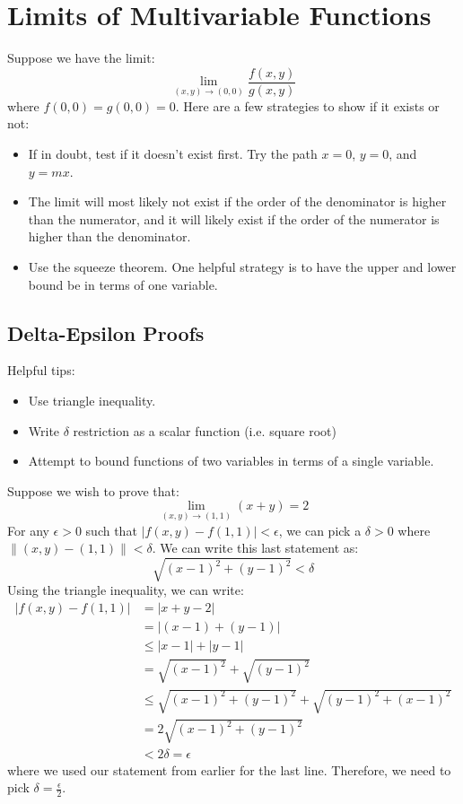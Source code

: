 \documentclass{article}
\begin{document}
        \section{Limits of Multivariable Functions}
        Suppose we have the limit:
    \begin{equation}
        \lim_{(x,y) \to (0,0)} \frac{f(x,y)}{g(x,y)}
    \end{equation}
    where $f(0,0)=g(0,0)=0$. Here are a few strategies to show if it exists or not:
    \begin{itemize}
        \item If in doubt, test if it doesn't exist first. Try the path $x=0$, $y=0$, and $y=mx$.
        \item The limit will most likely not exist if the order of the denominator is higher than the numerator, and it will likely exist if the order of the numerator is higher than the denominator.
        \item Use the squeeze theorem. One helpful strategy is to have the upper and lower bound be in terms of one variable.
    \end{itemize}
    \subsection{Delta-Epsilon Proofs}
    Helpful tips:
    \begin{itemize}
        \item Use triangle inequality.
        \item Write $\delta$ restriction as a scalar function (i.e. square root)
        \item Attempt to bound functions of two variables in terms of a single variable.
    \end{itemize}
    \begin{example}
        Suppose we wish to prove that:
        \begin{equation}
            \lim_{(x,y) \to (1,1)} (x+y) = 2
        \end{equation}
        For any $\epsilon > 0$ such that $\left|f(x,y) - f(1, 1)\right|<\epsilon$, we can pick a $\delta > 0$ where $\lVert (x,y) - (1, 1) \rVert < \delta$. We can write this last statement as:
        \begin{equation}
            \sqrt{(x-1)^2+(y-1)^2} < \delta
        \end{equation}
        Using the triangle inequality, we can write:
        \begin{align}
            |f(x,y) - f(1,1)| &= |x+y-2| \\ 
            &= |(x-1) + (y-1)| \\  
            &\le |x-1| + |y-1| \\ 
            &= \sqrt{(x-1)^2}+\sqrt{(y-1)^2} \\ 
            &\le \sqrt{(x-1)^2+(y-1)^2} + \sqrt{(y-1)^2+(x-1)^2} \\ 
            &= 2\sqrt{(x-1)^2+(y-1)^2} \\ 
            &< 2\delta =\epsilon
        \end{align}
        where we used our statement from earlier for the last line. Therefore, we need to pick $\delta = \frac{\epsilon}{2}$.
    \end{example}
\end{document}
